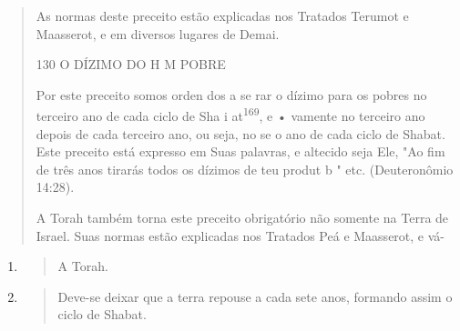 \begin{quote}
As normas deste preceito estão explicadas nos Tratados Terumot e
Maasserot, e em diversos lugares de Demai.

130 O DÍZIMO DO H M POBRE

Por este preceito somos orden dos a se rar o dízimo para os po­bres no
terceiro ano de cada ciclo de Sha i at\textsuperscript{169}, e • vamente
no terceiro ano depois de cada terceiro ano, ou seja, no se o ano de
cada ciclo de Shabat. Este preceito está expresso em Suas palavras, e
altecido seja Ele, "Ao fim de três anos tirarás todos os dízimos de teu
produt b " etc. (Deuteronômio 14:28).

A Torah também torna este preceito obrigatório não somente na Terra de
Israel. Suas normas estão explicadas nos Tratados Peá e Maasserot, e vá-
\end{quote}

\begin{enumerate}
\def\labelenumi{\arabic{enumi}.}
\setcounter{enumi}{167}
\item
  \begin{quote}
  A Torah.
  \end{quote}
\item
  \begin{quote}
  Deve-se deixar que a terra repouse a cada sete anos, formando assim o
  ciclo de Shabat.
  \end{quote}
\end{enumerate}

